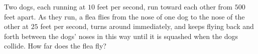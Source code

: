 Two dogs, each running at $10$ feet per second, run toward each other from $500$ feet apart. As they run, a flea flies from the nose of one dog to the nose of the other at $25$ feet per second, turns around immediately, and keeps flying back and forth between the dogs' noses in this way until it is squashed when the dogs collide. How far does the flea fly?
